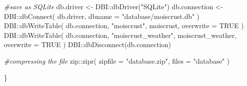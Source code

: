\documentclass[
  table]{article}
\newenvironment{Shaded}{\begin{snugshade}}{\end{snugshade}}
\newcommand{\AttributeTok}[1]{\textcolor[rgb]{0.77,0.63,0.00}{#1}}
\newcommand{\CommentTok}[1]{\textcolor[rgb]{0.56,0.35,0.01}{\textit{#1}}}
\newcommand{\ConstantTok}[1]{\textcolor[rgb]{0.00,0.00,0.00}{#1}}
\newcommand{\FunctionTok}[1]{\textcolor[rgb]{0.00,0.00,0.00}{#1}}
\newcommand{\NormalTok}[1]{#1}
\newcommand{\OtherTok}[1]{\textcolor[rgb]{0.56,0.35,0.01}{#1}}
\newcommand{\SpecialCharTok}[1]{\textcolor[rgb]{0.00,0.00,0.00}{#1}}
\newcommand{\StringTok}[1]{\textcolor[rgb]{0.31,0.60,0.02}{#1}}
\begin{document}
\begin{Shaded}
\begin{Highlighting}[]
  \CommentTok{\#save as SQLite}
\NormalTok{  db.driver }\OtherTok{\textless{}{-}}\NormalTok{ DBI}\SpecialCharTok{::}\FunctionTok{dbDriver}\NormalTok{(}\StringTok{"SQLite"}\NormalTok{)}
\NormalTok{  db.connection }\OtherTok{\textless{}{-}}\NormalTok{  DBI}\SpecialCharTok{::}\FunctionTok{dbConnect}\NormalTok{(}
\NormalTok{    db.driver, }
    \AttributeTok{dbname =} \StringTok{"database/moiscrust.db"}
\NormalTok{    )}
\NormalTok{  DBI}\SpecialCharTok{::}\FunctionTok{dbWriteTable}\NormalTok{(}
\NormalTok{    db.connection, }
    \StringTok{"moiscrust"}\NormalTok{, }
\NormalTok{    moiscrust, }
    \AttributeTok{overwrite =} \ConstantTok{TRUE}
\NormalTok{    )}
\NormalTok{    DBI}\SpecialCharTok{::}\FunctionTok{dbWriteTable}\NormalTok{(}
\NormalTok{    db.connection, }
    \StringTok{"moiscrust\_weather"}\NormalTok{, }
\NormalTok{    moiscrust\_weather, }
    \AttributeTok{overwrite =} \ConstantTok{TRUE}
\NormalTok{    )}
\NormalTok{  DBI}\SpecialCharTok{::}\FunctionTok{dbDisconnect}\NormalTok{(db.connection)}
  
  \CommentTok{\#compressing the file}
\NormalTok{  zip}\SpecialCharTok{::}\FunctionTok{zipr}\NormalTok{(}
    \AttributeTok{zipfile =} \StringTok{"database.zip"}\NormalTok{,}
    \AttributeTok{files =} \StringTok{"database"}
\NormalTok{  )}
  
\NormalTok{\}}
\end{Highlighting}
\end{Shaded}
\end{document}
